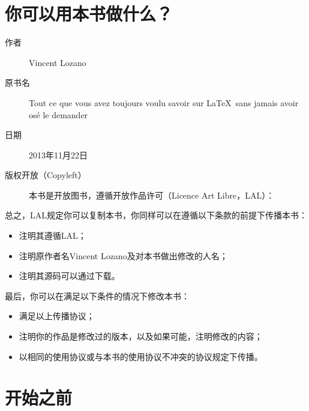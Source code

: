 \section*{你可以用本书做什么？}

\begin{description}
    \item[] 


\item[作者]Vincent Lozano
\item[原书名]Tout ce que vous avez toujours voulu savoir sur \LaTeX \ sans jamais avoir osé le demander
\item[日期]2013年11月22日
\item[版权开放（Copyleft）]本书是开放图书，遵循开放作品许可（Licence Art Libre，LAL）：


\end{description}
总之，LAL规定你可以复制本书，你同样可以在遵循以下条款的前提下传播本书：

\begin{itemize}
    \item 注明其遵循LAL；
    \item 注明原作者名Vincent Lozano及对本书做出修改的人名；
    \item 注明其源码可以通过下载。
\end{itemize}

最后，你可以在满足以下条件的情况下修改本书：

\begin{itemize}
    \item 满足以上传播协议；
    \item 注明你的作品是修改过的版本，以及如果可能，注明修改的内容；
    \item 以相同的使用协议或与本书的使用协议不冲突的协议规定下传播。
\end{itemize}

\section*{开始之前}

